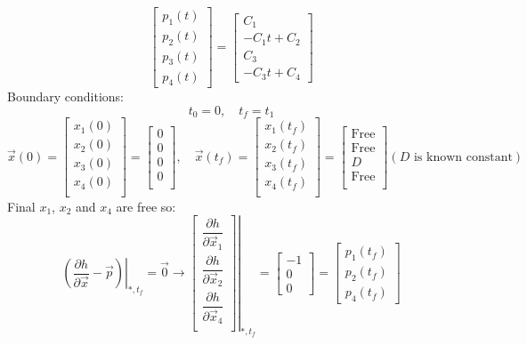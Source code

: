 \begin{equation}\label{SolvepQ2_a}
	\begin{bmatrix}
		p_1(t)\\
		p_2(t)\\
		p_3(t)\\
		p_4(t)
	\end{bmatrix} = \begin{bmatrix}
		C_1\\
		-C_1t+C_2\\
		C_3\\
		-C_3t+C_4
	\end{bmatrix} 
\end{equation}
Boundary conditions:
$$t_0 = 0,\quad t_f = t_1$$
$$\vec{x}(0) = \begin{bmatrix}
	x_1(0) \\
	x_2(0) \\
	x_3(0) \\
	x_4(0) \\
\end{bmatrix}= \begin{bmatrix}
	0 \\
	0 \\
	0 \\
	0 \\
\end{bmatrix}, \quad
\vec{x}(t_f) = \begin{bmatrix}
	x_1(t_f) \\
	x_2(t_f) \\
	x_3(t_f) \\
	x_4(t_f) \\
\end{bmatrix}= \begin{bmatrix}
	\text{Free} \\
	\text{Free} \\
	D \\
	\text{Free} \\
\end{bmatrix}
(D\text{ is known constant})$$
Final $x_1$, $x_2$ and $x_4$ are free so:
\begin{equation}\label{Solvep_1Q2_d}
	\left.(\dfrac{\partial h}{\partial \vec x} - \vec p) \right \vert_{*, t_f} = \vec 0 \to \left
	.\begin{bmatrix}
		\dfrac{\partial h}{\partial \vec x_1} \\[10pt]
		\dfrac{\partial h}{\partial \vec x_2} \\[10pt]
		\dfrac{\partial h}{\partial \vec x_4} \\
	\end{bmatrix}\right \vert_{*, t_f} = \begin{bmatrix}
	-1 \\
	0 \\
	0
\end{bmatrix} = \begin{bmatrix}
p_1(t_f) \\
p_2(t_f) \\
p_4(t_f)
\end{bmatrix} 
\end{equation}